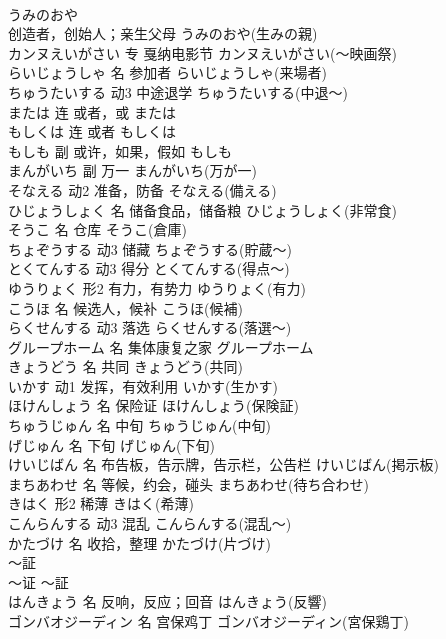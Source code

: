\documentclass[8pt]{extreport}
\begin{document}
\begin{CJK}{UTF8}{min}
\\	うみのおや	
\\	创造者，创始人；亲生父母	うみのおや(生みの親)	
\\	カンヌえいがさい	专	戛纳电影节	カンヌえいがさい(～映画祭)	
\\	らいじょうしゃ	名	参加者	らいじょうしゃ(来場者)	
\\	ちゅうたいする	动3	中途退学	ちゅうたいする(中退～)	
\\	または	连	或者，或	または	
\\	もしくは	连	或者	もしくは	
\\	もしも	副	或许，如果，假如	もしも	
\\	まんがいち	副	万一	まんがいち(万が一)	
\\	そなえる	动2	准备，防备	そなえる(備える)	
\\	ひじょうしょく	名	储备食品，储备粮	ひじょうしょく(非常食)	
\\	そうこ	名	仓库	そうこ(倉庫)	
\\	ちょぞうする	动3	储藏	ちょぞうする(貯蔵～)	
\\	とくてんする	动3	得分	とくてんする(得点～)	
\\	ゆうりょく	形2	有力，有势力	ゆうりょく(有力)	
\\	こうほ	名	候选人，候补	こうほ(候補)	
\\	らくせんする	动3	落选	らくせんする(落選～)	
\\	グループホーム	名	集体康复之家	グループホーム	
\\	きょうどう	名	共同	きょうどう(共同)	
\\	いかす	动1	发挥，有效利用	いかす(生かす)	
\\	ほけんしょう	名	保险证	ほけんしょう(保険証)	
\\	ちゅうじゅん	名	中旬	ちゅうじゅん(中旬)	
\\	げじゅん	名	下旬	げじゅん(下旬)	
\\	けいじばん	名	布告板，告示牌，告示栏，公告栏	けいじばん(掲示板)	
\\	まちあわせ	名	等候，约会，碰头	まちあわせ(待ち合わせ)	
\\	きはく	形2	稀薄	きはく(希薄)	
\\	こんらんする	动3	混乱	こんらんする(混乱～)	
\\	かたづけ	名	收拾，整理	かたづけ(片づけ)	
\\	～証	
\\	～证	～証	
\\	はんきょう	名	反响，反应；回音	はんきょう(反響)	
\\	ゴンバオジーディン	名	宫保鸡丁	ゴンバオジーディン(宮保鶏丁)	

\end{CJK}
\end{document}
